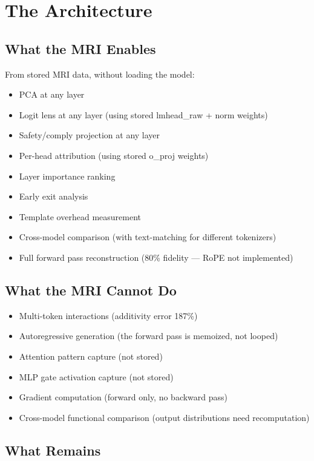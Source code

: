 \documentclass[11pt,a4paper]{report}
\begin{document}
\part{The Architecture}

\chapter{What the MRI Enables}

From stored MRI data, without loading the model:

\begin{itemize}[nosep]
\item PCA at any layer
\item Logit lens at any layer (using stored lmhead\_raw + norm weights)
\item Safety/comply projection at any layer
\item Per-head attribution (using stored o\_proj weights)
\item Layer importance ranking
\item Early exit analysis
\item Template overhead measurement
\item Cross-model comparison (with text-matching for different tokenizers)
\item Full forward pass reconstruction (80\% fidelity --- RoPE not implemented)
\end{itemize}

\chapter{What the MRI Cannot Do}

\begin{itemize}[nosep]
\item Multi-token interactions (additivity error 187\%)
\item Autoregressive generation (the forward pass is memoized, not looped)
\item Attention pattern capture (not stored)
\item MLP gate activation capture (not stored)
\item Gradient computation (forward only, no backward pass)
\item Cross-model functional comparison (output distributions need recomputation)
\end{itemize}

\chapter{What Remains}
\end{document}
